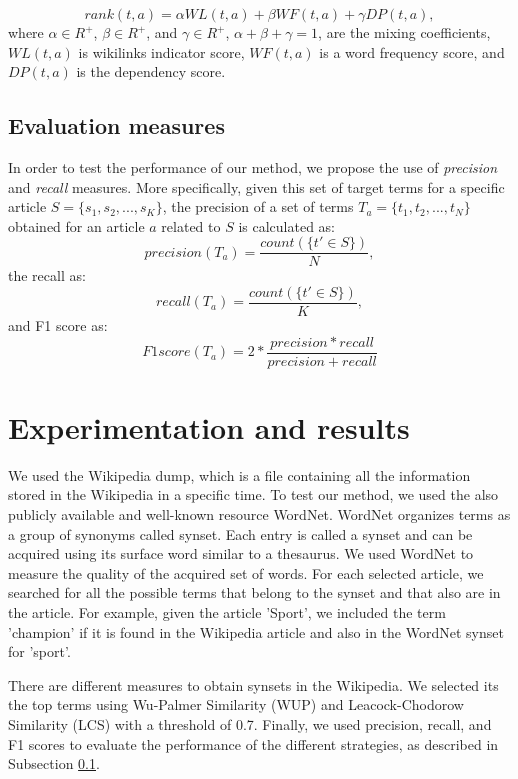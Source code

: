 \documentclass[oribibl]{llncs}
\begin{document}
\[
rank(t,a) = \alpha WL(t,a) + \beta WF(t,a) + \gamma DP(t,a),
\]where $\alpha \in R^+$, $\beta \in R^+$, and $\gamma \in R^+$, $\alpha + \beta + \gamma = 1$, are the mixing coefficients, $WL(t, a)$ is wikilinks indicator score, $WF(t,a)$ is a word frequency score, and $DP(t,a)$ is the dependency score.

\subsection{Evaluation measures} \label{subsec:eval}

In order to test the performance of our method, we propose the use of {\it precision} and {\it recall} measures. More specifically, given this set of target terms for a specific article $S = \{s_1,s_2,...,s_K\}$, the precision of a set of terms $T_a = \{t_1,t_2,...,t_N\}$ obtained for an article $a$ related to $S$ is calculated as:
\[
precision(T_a) = \frac{count(\{t' \in S\})}{N},
\] 
the recall as:
\[
recall(T_a) = \frac{count(\{t' \in S\})}{K},
\] 
and F1 score as:
\[
F1score(T_a) = 2*\frac{precision*recall}{precision + recall}
\]

\section{Experimentation and results}

We used the Wikipedia dump, which is a file containing all the information stored in the Wikipedia in a specific time. To test our method, we used the also publicly available and well-known resource WordNet. WordNet organizes terms as a group of synonyms called synset. Each entry is called a synset and can be acquired using its surface word similar to a thesaurus. We used WordNet to measure the quality of the acquired set of words. For each selected article, we searched for all the possible terms that belong to the synset and that also are in the article. For example, given the article 'Sport', we included the term 'champion' if it is found in the Wikipedia article and also in the WordNet synset for 'sport'.  

There are different measures to obtain synsets in the Wikipedia. We selected its the top terms using Wu-Palmer Similarity (WUP) \cite{Wu1994} and Leacock-Chodorow Similarity (LCS) \cite{Leacock1998} with a threshold of 0.7. Finally, we used precision, recall, and F1 scores to evaluate the performance of the different strategies, as described in Subsection \ref{subsec:eval}. 
\end{document}
